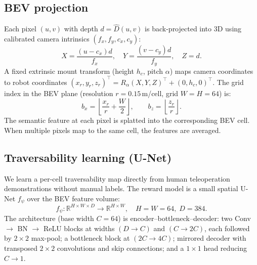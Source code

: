 \documentclass[conference]{IEEEtran}
\newcommand{\unet}{f_\psi}
\begin{document}
\subsection{BEV projection}

Each pixel $(u, v)$ with depth $d = \hat{D}(u, v)$ is back-projected into 3D
using calibrated camera intrinsics $(f_x, f_y, c_x, c_y)$:
\begin{equation}
  X = \frac{(u - c_x) d}{f_x}, \quad
  Y = \frac{(v - c_y) d}{f_y}, \quad
  Z = d.
\end{equation}
A fixed extrinsic mount transform (height $h_c$, pitch $\alpha$) maps
camera coordinates to robot coordinates
$(x_r, y_r, z_r)^\top = R_\alpha (X, Y, Z)^\top + (0, h_c, 0)^\top$.
The grid index in the BEV plane (resolution $r = 0.15$\,m/cell, grid
$W = H = 64$) is:
\begin{equation}
  b_x = \left\lfloor \frac{x_r}{r} + \frac{W}{2} \right\rfloor, \qquad
  b_z = \left\lfloor \frac{z_r}{r} \right\rfloor.
\end{equation}
The semantic feature at each pixel is splatted into the corresponding BEV
cell. When multiple pixels map to the same cell, the features are averaged.

\subsection{Traversability learning (U-Net)}
\label{sec:unet}

We learn a per-cell traversability map directly from human teleoperation
demonstrations without manual labels. The reward model is a small
spatial U-Net $\unet$ over the BEV feature volume:
\begin{equation}
  \unet : \mathbb{R}^{H \times W \times D} \to \mathbb{R}^{H \times W},
  \quad H = W = 64, \; D = 384.
\end{equation}
The architecture (base width $C = 64$) is encoder--bottleneck--decoder:
two Conv $\to$ BN $\to$ ReLU blocks at widths $(D \to C)$ and
$(C \to 2C)$, each followed by $2\times2$ max-pool; a bottleneck block at
$(2C \to 4C)$; mirrored decoder with transposed $2 \times 2$
convolutions and skip connections; and a $1 \times 1$ head reducing
$C \to 1$.
\end{document}
